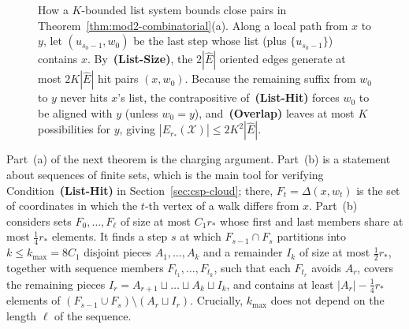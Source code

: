 \documentclass[11pt]{article}
\theoremstyle{definition}
\theoremstyle{remark}
\newcommand{\Ham}{\mathrm{Ham}}
\newcommand{\dHam}{\mathrm{d}_{\Ham}}
\begin{document}
\begin{figure}[ht]
\caption{How a $K$-bounded list system bounds close pairs in Theorem~\ref{thm:mod2-combinatorial}(a). Along a local path from $x$ to $y$, let $(u_{s_0-1}, w_0)$ be the last step whose list (plus $\{u_{s_0-1}\}$) contains $x$. By~\textbf{(List-Size)}, the $2|\widehat{E}|$ oriented edges generate at most $2 K |\widehat{E}|$ hit pairs $(x, w_0)$. Because the remaining suffix from $w_0$ to $y$ never hits $x$'s list, the contrapositive of~\textbf{(List-Hit)} forces $w_0$ to be aligned with $y$ (unless $w_0 = y$), and~\textbf{(Overlap)} leaves at most $K$ possibilities for $y$, giving $|E_{r_*}(\mathcal{X})| \le 2 K^2 |\widehat{E}|$.}
\label{fig:list-charging}
\end{figure}

Part~(a) of the next theorem is the charging argument. Part~(b) is a statement about sequences of finite sets, which is the main tool for verifying Condition~\textbf{(List-Hit)} in Section~\ref{sec:csp-cloud}; there, $F_t = \Delta(x, w_t)$ is the set of coordinates in which the $t$-th vertex of a walk differs from $x$. Part~(b) considers sets $F_0, \dots, F_\ell$ of size at most $C_1 r_*$ whose first and last members share at most $\frac{1}{4} r_*$ elements. It finds a step $s$ at which $F_{s-1} \cap F_s$ partitions into $k \le k_{\max} = 8 C_1$ disjoint pieces $A_1, \dots, A_k$ and a remainder $I_k$ of size at most $\frac{1}{2} r_*$, together with sequence members $F_{t_1}, \dots, F_{t_k}$, such that each $F_{t_r}$ avoids $A_r$, covers the remaining pieces $I_r = A_{r+1} \sqcup \dots \sqcup A_k \sqcup I_k$, and contains at least $|A_r| - \frac{1}{4} r_*$ elements of $(F_{s-1} \cup F_s) \setminus (A_r \sqcup I_r)$. Crucially, $k_{\max}$ does not depend on the length $\ell$ of the sequence.
\end{document}
